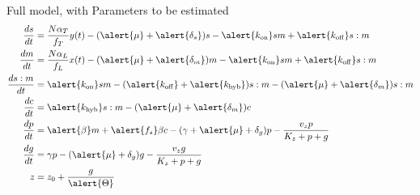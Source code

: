 \documentclass{beamer}
\begin{document}
\small
\begin{frame}{Full model, with Parameters to be estimated}
\begin{align} 
\frac{ds}{dt} &= \frac{N\alpha_{T}}{f_{T}} y(t)-(\alert{\mu} + \alert{\delta_{s}})s -\alert{k_{\mathrm{on}}}sm +\alert{k_{\mathrm{off}}}s:m \\
\frac{dm}{dt} &=  \frac{N\alpha_{L}}{f_{L}}x(t)-(\alert{\mu} + \alert{\delta_{m}})m -\alert{k_{\mathrm{on}}}sm +\alert{k_{\mathrm{off}}}s:m  \\
\frac{ds:m}{dt} & = \alert{k_{\mathrm{on}}}sm  - (\alert{k_{\mathrm{off}}}+ \alert{k_{\mathrm{hyb}}})s:m  -(\alert{\mu} + \alert{\delta_{m}} )s:m \\
\frac{dc}{dt} & = \alert{k_{\mathrm{hyb}}}s:m  -(\alert{\mu} + \alert{\delta_{m}})c  \\
\frac{dp}{dt} & = \alert{\beta} m +\alert{f_{s}}\beta c -(\gamma + \alert{\mu} + \delta_{g})p - \frac{v_{z}p}{K_{z}+p+g}   \\
\frac{dg}{dt} & = \gamma p - (\alert{\mu} + \delta_{g})g - \frac{v_{z}g}{K_{z}+p+g} \\
z &= z_{0} +\frac{g}{\alert{\Theta}} 
\end{align}
\end{frame}
\normalsize
\end{document}
